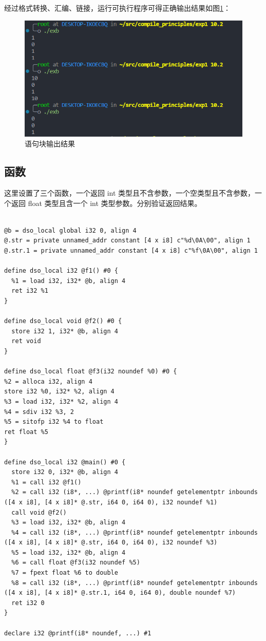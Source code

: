 \documentclass[UTF8,a4paper,10pt]{ctexart}
\begin{document}
经过格式转换、汇编、链接，运行可执行程序可得正确输出结果如图\ref{pic:8}：
\begin{figure}[H]
  \centering
  \includegraphics[width=\textwidth]{figure/exb.png}
  \caption{语句块输出结果}
  \label{pic:8}
\end{figure}

\subsection{函数}
这里设置了三个函数，一个返回 int 类型且不含参数，一个空类型且不含参数，一个返回 float 类型且含一个 int 类型参数。分别验证返回结果。
\begin{verbatim}

@b = dso_local global i32 0, align 4
@.str = private unnamed_addr constant [4 x i8] c"%d\0A\00", align 1
@.str.1 = private unnamed_addr constant [4 x i8] c"%f\0A\00", align 1

define dso_local i32 @f1() #0 {
  %1 = load i32, i32* @b, align 4
  ret i32 %1
}

define dso_local void @f2() #0 {
  store i32 1, i32* @b, align 4
  ret void
}

define dso_local float @f3(i32 noundef %0) #0 {
%2 = alloca i32, align 4
store i32 %0, i32* %2, align 4
%3 = load i32, i32* %2, align 4
%4 = sdiv i32 %3, 2
%5 = sitofp i32 %4 to float
ret float %5
}

define dso_local i32 @main() #0 {
  store i32 0, i32* @b, align 4
  %1 = call i32 @f1()
  %2 = call i32 (i8*, ...) @printf(i8* noundef getelementptr inbounds ([4 x i8], [4 x i8]* @.str, i64 0, i64 0), i32 noundef %1)
  call void @f2()
  %3 = load i32, i32* @b, align 4
  %4 = call i32 (i8*, ...) @printf(i8* noundef getelementptr inbounds ([4 x i8], [4 x i8]* @.str, i64 0, i64 0), i32 noundef %3)
  %5 = load i32, i32* @b, align 4
  %6 = call float @f3(i32 noundef %5)
  %7 = fpext float %6 to double
  %8 = call i32 (i8*, ...) @printf(i8* noundef getelementptr inbounds ([4 x i8], [4 x i8]* @.str.1, i64 0, i64 0), double noundef %7)
  ret i32 0
}

declare i32 @printf(i8* noundef, ...) #1

\end{verbatim}
\end{document}
